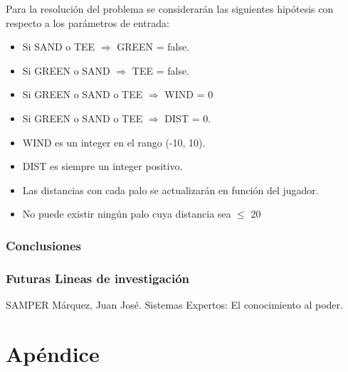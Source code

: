 \documentclass[runningheads,a4paper]{llncs}
\begin{document}
Para la resolución del problema se considerarán las siguientes hipótesis con respecto a los parámetros de entrada:\\
\begin{itemize}
	\item Si SAND o TEE $\Rightarrow$ GREEN = false.
	\item Si GREEN o SAND $\Rightarrow$ TEE = false.
	\item Si GREEN o SAND o TEE $\Rightarrow$ WIND = 0 
	\item Si GREEN o SAND o TEE $\Rightarrow$ DIST = 0.
	\item WIND es un integer en el rango (-10, 10).
	\item DIST es siempre un integer positivo.
	\item Las distancias con cada palo se actualizarán en función del jugador.
	\item No puede existir ningún palo cuya distancia sea $\leq$ 20
\end{itemize}


\section{Conclusiones}

\section{Futuras Lineas de investigación}



\begin{thebibliography}{7}

 SAMPER Márquez, Juan José. Sistemas Expertos: El conocimiento al poder.

\end{thebibliography}

\part{Apéndice}
\appendix
\end{document}
